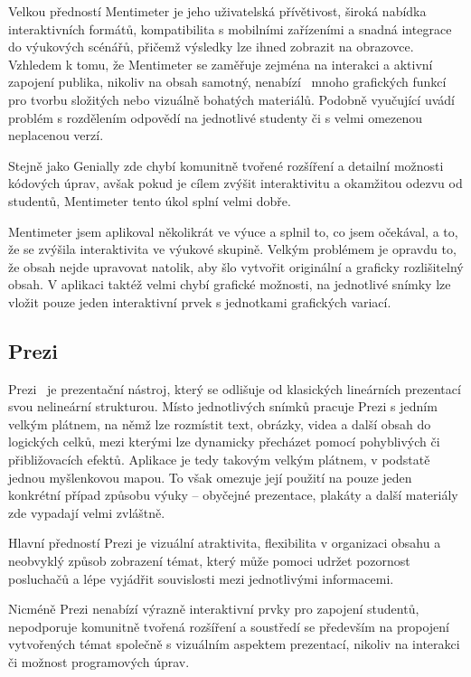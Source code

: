 Velkou předností Mentimeter je jeho uživatelská přívětivost, široká nabídka interaktivních formátů, kompatibilita s mobilními zařízeními a snadná integrace do výukových scénářů, přičemž výsledky lze ihned zobrazit na obrazovce. 
Vzhledem k tomu, že Mentimeter se zaměřuje zejména na interakci a aktivní zapojení publika, nikoliv na obsah samotný, nenabízí~\cite{mentimeter_review} mnoho grafických funkcí pro tvorbu složitých nebo vizuálně bohatých materiálů. 
Podobně vyučující uvádí problém s rozdělením odpovědí na jednotlivé studenty či s velmi omezenou neplacenou verzí.

Stejně jako Genially zde chybí komunitně tvořené rozšíření a detailní možnosti kódových úprav, avšak pokud je cílem zvýšit interaktivitu a okamžitou odezvu od studentů, Mentimeter tento úkol splní velmi dobře.

Mentimeter jsem aplikoval několikrát ve výuce a splnil to, co jsem očekával, a to, že se zvýšila interaktivita ve výukové skupině. 
Velkým problémem je opravdu to, že obsah nejde upravovat natolik, aby šlo vytvořit originální a graficky rozlišitelný obsah. 
V aplikaci taktéž velmi chybí grafické možnosti, na jednotlivé snímky lze vložit pouze jeden interaktivní prvek s jednotkami grafických variací.

\subsection{Prezi}

Prezi~\cite{prezi} je prezentační nástroj, který se odlišuje od klasických lineárních prezentací svou nelineární strukturou.
Místo jednotlivých snímků pracuje Prezi s jedním velkým plátnem, na němž lze rozmístit text, obrázky, videa a další obsah do logických celků, mezi kterými lze dynamicky přecházet pomocí pohyblivých či přibližovacích efektů.
Aplikace je tedy takovým velkým plátnem, v podstatě jednou myšlenkovou mapou.
To však omezuje její použití na pouze jeden konkrétní případ způsobu výuky -- obyčejné prezentace, plakáty a další materiály zde vypadají velmi zvláštně.

Hlavní předností Prezi je vizuální atraktivita, flexibilita v organizaci obsahu a neobvyklý způsob zobrazení témat, který může pomoci udržet pozornost posluchačů a lépe vyjádřit souvislosti mezi jednotlivými informacemi. 

Nicméně Prezi nenabízí výrazně interaktivní prvky pro zapojení studentů, nepodporuje komunitně tvořená rozšíření a soustředí se především na propojení vytvořených témat společně s vizuálním aspektem prezentací, nikoliv na interakci či možnost programových úprav.

